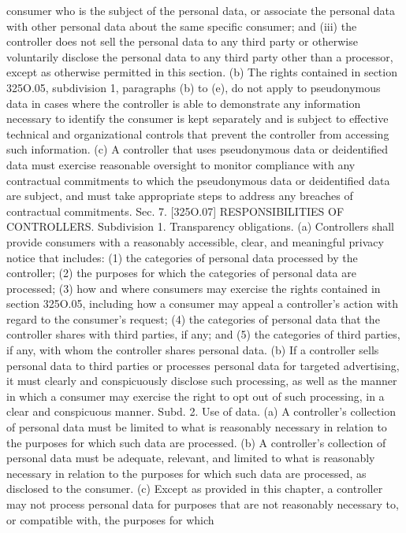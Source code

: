 consumer who is the subject of the personal data, or associate the personal data with other
personal data about the same specific consumer; and
(iii) the controller does not sell the personal data to any third party or otherwise
voluntarily disclose the personal data to any third party other than a processor, except as
otherwise permitted in this section.
(b) The rights contained in section 325O.05, subdivision 1, paragraphs (b) to (e), do not
apply to pseudonymous data in cases where the controller is able to demonstrate any
information necessary to identify the consumer is kept separately and is subject to effective
technical and organizational controls that prevent the controller from accessing such
information.
(c) A controller that uses pseudonymous data or deidentified data must exercise reasonable
oversight to monitor compliance with any contractual commitments to which the
pseudonymous data or deidentified data are subject, and must take appropriate steps to
address any breaches of contractual commitments.
Sec. 7. [325O.07] RESPONSIBILITIES OF CONTROLLERS.
Subdivision 1. Transparency obligations. (a) Controllers shall provide consumers with
a reasonably accessible, clear, and meaningful privacy notice that includes:
(1) the categories of personal data processed by the controller;
(2) the purposes for which the categories of personal data are processed;
(3) how and where consumers may exercise the rights contained in section 325O.05,
including how a consumer may appeal a controller's action with regard to the consumer's
request;
(4) the categories of personal data that the controller shares with third parties, if any;
and
(5) the categories of third parties, if any, with whom the controller shares personal data.
(b) If a controller sells personal data to third parties or processes personal data for targeted
advertising, it must clearly and conspicuously disclose such processing, as well as the manner
in which a consumer may exercise the right to opt out of such processing, in a clear and
conspicuous manner.
Subd. 2. Use of data. (a) A controller's collection of personal data must be limited to
what is reasonably necessary in relation to the purposes for which such data are processed.
(b) A controller's collection of personal data must be adequate, relevant, and limited to
what is reasonably necessary in relation to the purposes for which such data are processed,
as disclosed to the consumer.
(c) Except as provided in this chapter, a controller may not process personal data for
purposes that are not reasonably necessary to, or compatible with, the purposes for which
